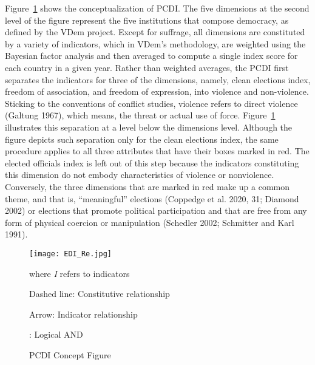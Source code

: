 \documentclass [11pt]{article}
\begin{document}
Figure~\ref{fig3} shows the conceptualization of PCDI. The five dimensions at the second level of the figure represent the five institutions that compose democracy, as defined by the VDem project. Except for suffrage, all dimensions are constituted by a variety of indicators, which in VDem's methodology, are weighted using the Bayesian factor analysis and then averaged to compute a single index score for each country in a given year. Rather than weighted averages, the PCDI first separates the indicators for three of the dimensions, namely, clean elections index, freedom of association, and freedom of expression, into violence and non-violence. Sticking to the conventions of conflict studies, violence refers to direct violence (Galtung 1967), which means, the threat or actual use of force. Figure~\ref{fig3} illustrates this separation at a level below the dimensions level. Although the figure depicts such separation only for the clean elections index, the same procedure applies to all three attributes that have their boxes marked in red. The elected officials index is left out of this step because the indicators constituting this dimension do not embody characteristics of violence or nonviolence. Conversely, the three dimensions that are marked in red make up a common theme, and that is, ``meaningful'' elections (Coppedge et al. 2020, 31; Diamond 2002) or elections that promote political participation and that are free from any form of physical coercion or manipulation (Schedler 2002; Schmitter and Karl 1991).

\begin{figure} [h!]

\caption{PCDI Concept Figure}
\label{fig3}%
\begin{center} 
\small
 \texttt{[image: EDI\_Re.jpg]}
 
\footnotesize{where \emph{I} refers to indicators}

{\footnotesize Dashed line: Constitutive relationship}

{\footnotesize Arrow: Indicator relationship}

{\footnotesize * : Logical AND}

\end{center} 
\end{figure}
\end{document}
